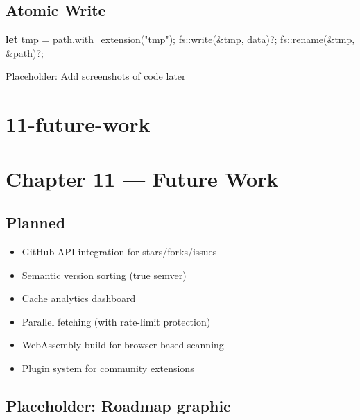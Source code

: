 \documentclass[
  letterpaper,
  DIV=11,
  numbers=noendperiod]{scrreprt}
\newenvironment{Shaded}{\begin{snugshade}}{\end{snugshade}}
\newcommand{\KeywordTok}[1]{\textcolor[rgb]{0.00,0.23,0.31}{\textbf{#1}}}
\newcommand{\NormalTok}[1]{\textcolor[rgb]{0.00,0.23,0.31}{#1}}
\newcommand{\OperatorTok}[1]{\textcolor[rgb]{0.37,0.37,0.37}{#1}}
\newcommand{\PreprocessorTok}[1]{\textcolor[rgb]{0.68,0.00,0.00}{#1}}
\newcommand{\StringTok}[1]{\textcolor[rgb]{0.13,0.47,0.30}{#1}}
\providecommand{\tightlist}{%
  \setlength{\itemsep}{0pt}\setlength{\parskip}{0pt}}
\begin{document}
\section{Atomic Write}\label{atomic-write}

\begin{Shaded}
\begin{Highlighting}[]
\KeywordTok{let}\NormalTok{ tmp }\OperatorTok{=}\NormalTok{ path}\OperatorTok{.}\NormalTok{with\_extension(}\StringTok{"tmp"}\NormalTok{)}\OperatorTok{;}
\PreprocessorTok{fs::}\NormalTok{write(}\OperatorTok{\&}\NormalTok{tmp}\OperatorTok{,}\NormalTok{ data)}\OperatorTok{?;}
\PreprocessorTok{fs::}\NormalTok{rename(}\OperatorTok{\&}\NormalTok{tmp}\OperatorTok{,} \OperatorTok{\&}\NormalTok{path)}\OperatorTok{?;}
\end{Highlighting}
\end{Shaded}

Placeholder: Add screenshots of code later

\chapter{11-future-work}\label{future-work}

\chapter{Chapter 11 --- Future Work}\label{chapter-11-future-work}

\section{Planned}\label{planned}

\begin{itemize}
\tightlist
\item
  GitHub API integration for stars/forks/issues
\item
  Semantic version sorting (true semver)
\item
  Cache analytics dashboard
\item
  Parallel fetching (with rate-limit protection)
\item
  WebAssembly build for browser-based scanning
\item
  Plugin system for community extensions
\end{itemize}

\section{Placeholder: Roadmap
graphic}\label{placeholder-roadmap-graphic}
\end{document}
